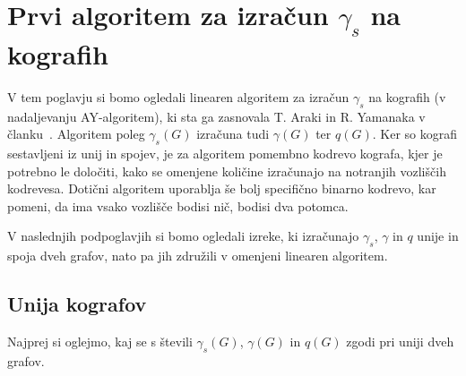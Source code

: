 \documentclass[12pt,a4paper,twoside]{article}
\theoremstyle{definition} %
\theoremstyle{plain} %
\numberwithin{equation}{section}  %
\begin{document}
\section{Prvi algoritem za izračun $\gamma_s$ na kografih}\label{sec:prvialgoritem}
V tem poglavju si bomo ogledali linearen algoritem za izračun $\gamma_s$ na kografih (v nadaljevanju AY-algoritem), ki sta ga zasnovala T. Araki in R. Yamanaka v članku~\cite{araki2019secure}. Algoritem poleg $\gamma_s(G)$ izračuna tudi $\gamma(G)$ ter $q(G)$. Ker so kografi sestavljeni iz unij in spojev, je za algoritem pomembno kodrevo kografa, kjer je potrebno le določiti, kako se omenjene količine izračunajo na notranjih vozliščih kodrevesa. Dotični algoritem uporablja še bolj specifično binarno kodrevo, kar pomeni, da ima vsako vozlišče bodisi nič, bodisi dva potomca.

V naslednjih podpoglavjih si bomo ogledali izreke, ki izračunajo $\gamma_s$, $\gamma$ in $q$ unije in spoja dveh grafov, nato pa jih združili v omenjeni linearen algoritem.

\subsection{Unija kografov} \label{union}
Najprej si oglejmo, kaj se s števili $\gamma_s(G)$, $\gamma(G)$ in $q(G)$ zgodi pri uniji dveh grafov.
\end{document}
